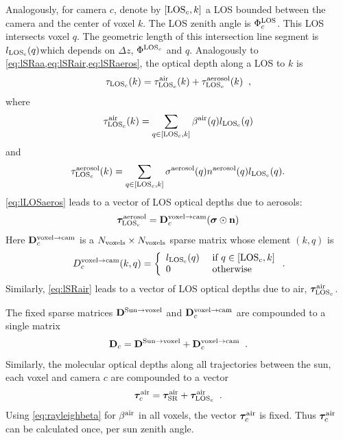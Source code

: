 \documentclass[10pt,letterpaper]{article}
\newcommand{\vect}[1]{\bm{#1}}
\begin{document}
Analogously, for camera $c$, denote by $[{\rm LOS}_c,k]$ a LOS bounded
between the camera and the center of voxel $k$. The LOS zenith angle
is $\Phi^{\rm LOS}_c$.  This LOS intersects voxel $q$. The geometric
length of this intersection line segment is $l_{\rm LOS_c}(q)$which
depends on $\Delta z$, $\Phi^{{\rm LOS}_c}$ and $q$.  Analogously to
\cref{eq:lSRaa,eq:lSRair,eq:lSRaeros}, the optical depth along a LOS
to $k$ is
\begin{equation}
  \tau_{{\rm LOS}_c}(k)=
  \tau_{{\rm LOS}_c}^{\rm air}(k) +  \tau_{{\rm LOS}_c}^{\rm aerosol}(k)
  \;\;,
  \label{eq:lLOSaerot}
\end{equation}
where
\begin{equation}
  \tau_{{\rm LOS}_c}^{\rm air}(k)=
  \sum_{q \in[{\rm LOS}_c,k]}
  \beta^{\rm air}(q)  l_{\rm LOS_c}(q)
  \label{eq:lLOSair}
\end{equation}
and
\begin{align}
  \label{eq:lLOSaeros}
  \tau_{{\rm LOS}_c}^{\rm aerosol}(k) = \sum_{q \in[{\rm LOS}_c,k]}
  \sigma^{\rm aerosol}(q) n^{\rm aerosol}(q) l_{\rm LOS_c}(q).
\end{align}
\cref{eq:lLOSaeros} leads to a vector of LOS optical depths due to
aerosols:
\begin{equation}
  \vect{\tau}_{{\rm LOS}_c}^{\rm aerosol}=
  {\bf D}^{\mathrm{voxel \rightarrow cam}}_c
  (\vect{\sigma} \odot {\bf n})
  \label{eq:tauLOSvec1}
\end{equation}
Here ${\bf D}^{\mathrm{voxel \rightarrow cam}}_c$ is a $N_{\rm
  voxels}\times N_{\rm voxels}$ sparse matrix whose element $(k,q)$ is
\begin{equation}
  D^{\mathrm{voxel \rightarrow cam}}_c(k,q) =
  \left\{
    \begin{array}{ll}
      l_{\rm LOS_c}(q) & \mbox{ if $q \in[{\rm LOS}_c,k]$} \\
      0  & \mbox{ otherwise}
      \label{eq:Dvc}
    \end{array}
  \right.
  .
  \hspace{-0.05cm}
\end{equation}
Similarly, \cref{eq:lSRair} leads to a vector of LOS optical depths
due to air, $\vect{\tau}_{{\rm LOS}_c}^{\rm air}$.

The fixed sparse matrices ${\bf D}^{\mathrm{Sun \rightarrow voxel}}$
and ${\bf D}^{\mathrm{voxel \rightarrow cam}}_c$ are compounded to a
single matrix
\begin{equation}
  {\bf D}_c=
  {\bf D}^{\mathrm{Sun \rightarrow voxel}}+
  {\bf D}^{\mathrm{voxel \rightarrow cam}}_c
  \;\;.
  \label{eq:Dtotal}
\end{equation}
Similarly, the molecular optical depths along all trajectories between
the sun, each voxel and camera $c$ are compounded to a vector
\begin{equation}
  \vect{\tau}_c^{\rm air}=
  \vect{\tau}_{\rm SR}^{\rm air}+
  \vect{\tau}_{{\rm LOS}_c}^{\rm air}
  \;\;.
  \label{eq:tauairtotal}
\end{equation}
Using \cref{eq:rayleighbeta} for $\beta^{\rm air}$ in all voxels, the
vector $\vect{\tau}_c^{\rm air}$ is fixed. Thus $\vect{\tau}_c^{\rm
  air}$ can be calculated once, per sun zenith angle.
\end{document}
